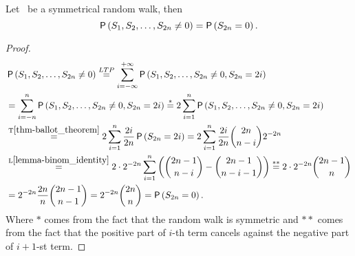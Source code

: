 \begin{lemma}\label{lemma-main_lemma}
 Let \rw\ be a symmetrical random walk, then
 \[
   \operatorname{\mathsf{P}} \left( S_1, S_2, \ldots, S_{2n}\neq 0 \right) =\operatorname{\mathsf{P}} \left( S_{2n}=0 \right).
  \]
\end{lemma}
\begin{proof}
  \[
  \begin{split}
    & \pr \left(S_1, S_2, \ldots, S_{2n}\neq 0 \right)
    \ltp \suma[i][-\infty][\pinf] \pr \left( S_1 , S_2, \ldots, S_{2n}\neq 0, S_{2n}=2i \right)\\
    & =\suma[i][-n][n] \pr \left( S_1 , S_2, \ldots, S_{2n}\neq 0, S_{2n}=2i \right)
    \overset{*}{=}2\suma \pr \left( S_1 , S_2, \ldots, S_{2n}\neq 0, S_{2n}=2i \right)\\
    & \overset{\text{T}\ref{thm-ballot_theorem}}{=}2\suma \frac{2i}{2n}\pr \left( S_{2n}=2i \right) =2\suma \frac{2i}{2n}\binom{2n}{n-i}2^{-2n}\\
    & \overset{\text{L}\ref{lemma-binom_identity}}{=} 2\cdot 2^{-2n}\suma \left( \binom{2n-1}{n-i}-\binom{2n-1}{n-i-1} \right) \overset{**}{=}2\cdot 2^{-2n}\binom{2n-1}{n}\\
    &=2^{-2n}\frac{2n}{n}\binom{2n-1}{n-1}
  =2^{-2n}\binom{2n}{n}=\pr \left( S_{2n}=0 \right).
  \end{split}
  \]
  Where $*$ comes from the fact that the random walk is symmetric and $**$ comes from the fact that the positive part of $i$-th term cancels against the negative part of $i+1$-st term.
\end{proof}
\begin{comment}
\begin{thm}\label{thm-return_origin_upto_time}
 \Lrws. The probability that the last return to origin up to \Time $2n$ occurred \intime $2k$
 is $\pr \left( S_{2k}=0 \right) \pr \left( S_{2n-2k}=0 \right) $.
\end{thm}
\begin{proof}
 \[
  \begin{split}
     & \alpha_{2n} \left( 2k \right) =u_{2k}u_{2n-2k}
     =\pr \left( S_{2k}=0 \right) \pr \left( S_{2k+1}, S_{2k+2}, \ldots, S_{2n}\neq 0 \mid S_{2k}=0 \right)\\
     & \overset{\text{L}\ref{lemma-temporal_homogeneity}}{=}\pr \left( S_{2k}=0 \right) \pr \left( S_{1}, S_{2}, \ldots, S_{2n-2k}\neq 0 \right)
     \overset{\text{T}\ref{lemma-main_lemma}}{=}\pr \left( S_{2k}=0 \right) \pr \left( S_{2n-2k}=0 \right).
  \end{split}
 \]
\end{proof}
\end{comment}
